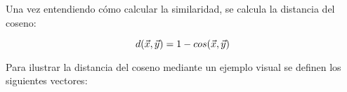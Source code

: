     Una vez entendiendo cómo calcular la similaridad, se calcula la distancia del coseno:
    
    \begin{equation}
        d(\vec{x}, \vec{y}) = 1 - cos(\vec{x}, \vec{y})
        \addequation{Definición de Distancia del Coseno}
    \end{equation}

    Para ilustrar la distancia del coseno mediante un ejemplo visual se definen los siguientes vectores:

    

    \newpage

    





    